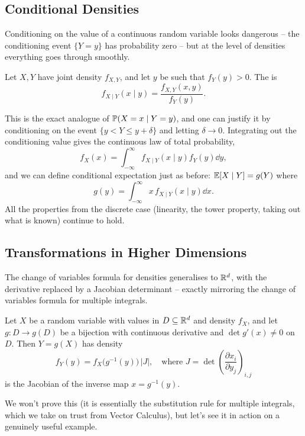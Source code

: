 \documentclass[a4paper]{scrartcl}
\begin{document}
\subsection{Conditional Densities}

Conditioning on the value of a continuous random variable looks dangerous -- the conditioning event $\{Y = y\}$ has probability zero -- but at the level of densities everything goes through smoothly.

\begin{definition}
	Let $X, Y$ have joint density $f_{X, Y}$, and let $y$ be such that $f_Y(y) > 0$. The  is
	$$
	f_{X \mid Y}(x \mid y) = \frac{f_{X, Y}(x, y)}{f_Y(y)}.
	$$
\end{definition}

This is the exact analogue of $\mathbb{P}(X = x \mid Y = y)$, and one can justify it by conditioning on the event $\{y < Y \leq y + \delta\}$ and letting $\delta \rightarrow 0$. Integrating out the conditioning value gives the continuous law of total probability,
$$
f_X(x) = \int_{-\infty}^{\infty} f_{X \mid Y}(x \mid y) f_Y(y) \dd y,
$$
and we can define conditional expectation just as before: $\mathbb{E}[X \mid Y] = g(Y)$ where
$$
g(y) = \int_{-\infty}^{\infty} x \, f_{X \mid Y}(x \mid y)\dd x.
$$
All the properties from the discrete case (linearity, the tower property, taking out what is known) continue to hold.

\subsection{Transformations in Higher Dimensions}

The change of variables formula for densities generalises to $\mathbb{R}^d$, with the derivative replaced by a Jacobian determinant -- exactly mirroring the change of variables formula for multiple integrals.

\begin{theorem}
	Let $X$ be a random variable with values in $D \subseteq \mathbb{R}^d$ and density $f_X$, and let $g: D \rightarrow g(D)$ be a bijection with continuous derivative and $\det g'(x) \neq 0$ on $D$. Then $Y = g(X)$ has density
	$$
	f_Y(y) = f_X\big(g^{-1}(y)\big) \, |J|, \quad \text{where } J = \det\left(\frac{\partial x_i}{\partial y_j}\right)_{i, j}
	$$
	is the Jacobian of the inverse map $x = g^{-1}(y)$.
\end{theorem}

We won't prove this (it is essentially the substitution rule for multiple integrals, which we take on trust from Vector Calculus), but let's see it in action on a genuinely useful example.
\end{document}

